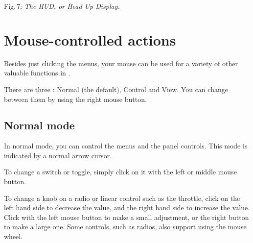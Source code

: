 \medskip

 \centerline{}

\smallskip
 \noindent
Fig.\,7: \textit{The HUD, or Head Up Display.}
\medskip

\section{Mouse-controlled actions}

Besides just clicking the menus, your mouse can be used for a variety of other valuable
functions in \FlightGear{}.

There are three : Normal (the default), Control and View. You can
change between them by using the right mouse button.

\subsection{Normal mode}

In normal mode, you can control the menus and the panel controls. This mode is indicated by
a normal arrow cursor.

To change a switch or toggle, simply click on it with the left or middle mouse button.

To change a knob on a radio or linear control such as the throttle, click on the left
hand side to decrease the value, and the right hand side to increase the value. Click
with the left mouse button to make a small adjustment, or the right button to make a
large one. Some controls, such as radios, also support using the mouse wheel.

